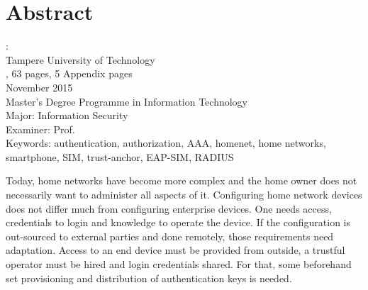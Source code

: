 \documentclass[12pt,a4paper,english]{tutthesis}
\begin{document}
\setcounter{page}{0} %

\chapter*{Abstract}

\begin{spacing}{1.0}
  {\bf \textsf{\MakeUppercase{\@author}}}: \@title\\   %
   \textsf{Tampere University of Technology}\\
   \textsf{\@thesistype, 63 pages, 5 Appendix pages} \\
   \textsf{November 2015}\\
   \textsf{Master's Degree Programme in Information Technology}\\
   \textsf{Major: Information Security}\\
   \textsf{Examiner: Prof. \@examiner}\\ %
   \textsf{Keywords: authentication, authorization, AAA, homenet, home networks, smartphone, SIM, trust-anchor, EAP-SIM, RADIUS}\\
\end{spacing}


Today, home networks have become more complex and the home owner 
does not necessarily want to administer all aspects of it.
Configuring home network devices does not differ much from configuring enterprise devices. One needs access, credentials to login and knowledge to operate the device. If the configuration is out-sourced to external parties and 
done remotely, those requirements need adaptation.
Access to an end device must be provided from outside, a trustful operator must be hired and login credentials shared.
For that,  some beforehand set provisioning and distribution of authentication keys is needed.
\end{document}
